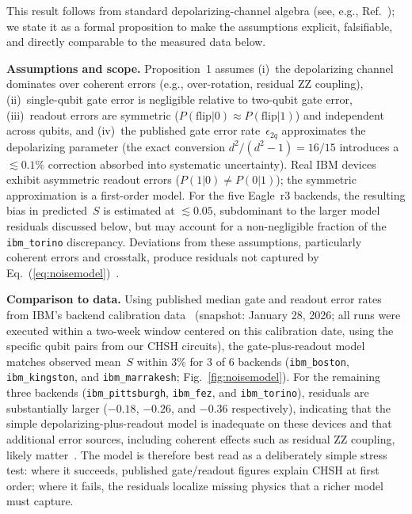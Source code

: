 \documentclass[aps,prxquantum,twocolumn,superscriptaddress,amsmath,amssymb,longbibliography,floatfix]{revtex4-2}
\begin{document}
\noindent This result follows from standard depolarizing-channel algebra (see, e.g., Ref.~\cite{Gambetta2017}); we state it as a formal proposition to make the assumptions explicit, falsifiable, and directly comparable to the measured data below.

\textbf{Assumptions and scope.} Proposition~1 assumes (i)~the depolarizing channel dominates over coherent errors (e.g., over-rotation, residual ZZ coupling), (ii)~single-qubit gate error is negligible relative to two-qubit gate error, (iii)~readout errors are symmetric ($P(\text{flip}|0) \approx P(\text{flip}|1)$) and independent across qubits, and (iv)~the published gate error rate~$\epsilon_{2q}$ approximates the depolarizing parameter (the exact conversion $d^2/(d^2{-}1) = 16/15$ introduces a ${\lesssim}0.1\%$ correction absorbed into systematic uncertainty). Real IBM devices exhibit asymmetric readout errors ($P(1|0) \neq P(0|1)$); the symmetric approximation is a first-order model. For the five Eagle~r3 backends, the resulting bias in predicted~$S$ is estimated at $\lesssim 0.05$, subdominant to the larger model residuals discussed below, but may account for a non-negligible fraction of the \texttt{ibm\_torino} discrepancy. Deviations from these assumptions, particularly coherent errors and crosstalk, produce residuals not captured by Eq.~(\ref{eq:noisemodel})~\cite{Sarovar2020}.

\textbf{Comparison to data.} Using published median gate and readout error rates from IBM's backend calibration data~\cite{IBM2024} (snapshot: January 28, 2026; all runs were executed within a two-week window centered on this calibration date, using the specific qubit pairs from our CHSH circuits), the gate-plus-readout model matches observed mean~$S$ within 3\% for 3 of 6 backends (\texttt{ibm\_boston}, \texttt{ibm\_kingston}, and \texttt{ibm\_marrakesh}; Fig.~\ref{fig:noisemodel}). For the remaining three backends (\texttt{ibm\_pittsburgh}, \texttt{ibm\_fez}, and \texttt{ibm\_torino}), residuals are substantially larger ($-0.18$, $-0.26$, and $-0.36$ respectively), indicating that the simple depolarizing-plus-readout model is inadequate on these devices and that additional error sources, including coherent effects such as residual ZZ coupling, likely matter~\cite{Gambetta2017}. The model is therefore best read as a deliberately simple stress test: where it succeeds, published gate/readout figures explain CHSH at first order; where it fails, the residuals localize missing physics that a richer model must capture.
\end{document}
